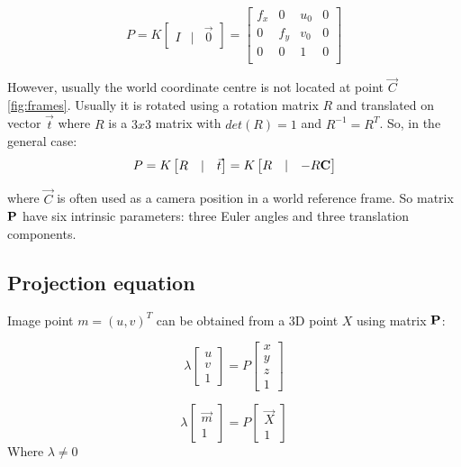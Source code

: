 \begin{equation}
P = K \begin{bmatrix} I & | & \vec{0} \end{bmatrix} = 
    \begin{bmatrix} 
    f_x & 0 & u_0 & 0 \\
    0 & f_y & v_0 & 0 \\ 
    0 & 0 & 1 & 0 \\
    \end{bmatrix}    
\end{equation}

However, usually the world coordinate centre is not located at point $\vec{C}$ \autoref{fig:frames}. 
Usually it is rotated using a rotation matrix $R$ and translated on vector $\vec{t}$ where $R$ is a $3x3$ matrix with $det(R) = 1$ and $R^{-1} = R^T$. 
So, in the general case:
\begin{equation}
    P = K \begin{bmatrix} R & | & \vec{t} \end{bmatrix} = 
    K \begin{bmatrix} R & | & - R \bf{C} \end{bmatrix}
\end{equation}

where $\vec{C}$ is often used as a camera position in a world reference frame. 
So matrix $\bf{P}$ have six intrinsic parameters: three Euler angles and three translation components. 

\subsection{Projection equation}

Image point $m = (u, v)^T$ can be obtained from a 3D point $X$ using matrix $\bf{P}$:

\begin{equation}
    \label{eq:projection}
    \lambda \begin{bmatrix} 
        u \\ v \\ 1 \end{bmatrix} = P \begin{bmatrix} x \\ y \\ z \\ 1
    \end{bmatrix}
\end{equation}

\begin{equation}
    \lambda \begin{bmatrix} 
    \vec{m} \\ 1 \end{bmatrix} = P \begin{bmatrix} \vec{X} \\ 1
        \end{bmatrix}
\end{equation}
Where $\lambda \neq 0$


